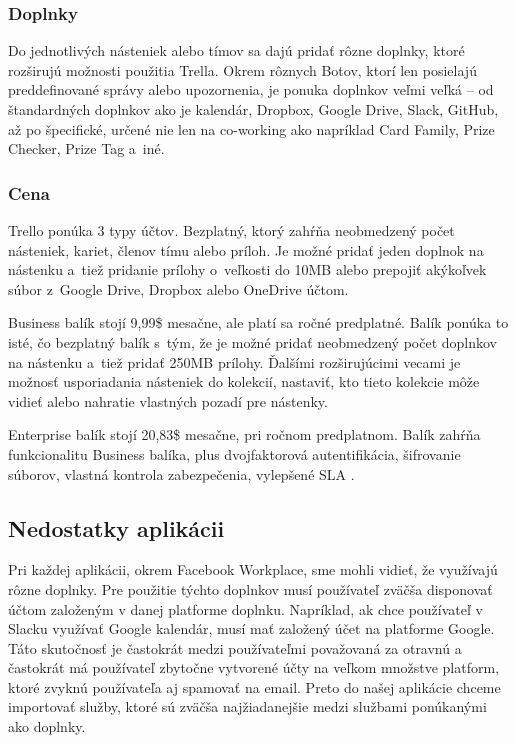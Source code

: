 \subsubsection{Doplnky}
\indent Do jednotlivých násteniek alebo tímov sa dajú pridať rôzne doplnky, ktoré rozširujú možnosti použitia Trella. Okrem rôznych Botov, ktorí len posielajú preddefinované správy alebo upozornenia, je ponuka doplnkov veľmi veľká – od štandardných doplnkov ako je kalendár, Dropbox, Google Drive, Slack, GitHub, až po špecifické, určené nie len na co-working ako napríklad Card Family, Prize Checker, Prize Tag a iné. 
\subsubsection{Cena}
\indent Trello ponúka 3 typy účtov. Bezplatný, ktorý zahŕňa neobmedzený počet násteniek, kariet, členov tímu alebo príloh. Je možné pridať jeden doplnok na nástenku a tiež pridanie prílohy o veľkosti do 10MB alebo prepojiť akýkoľvek súbor z Google Drive, Dropbox alebo OneDrive účtom. 

\indent Business balík stojí 9,99\$ mesačne, ale platí sa ročné predplatné. Balík ponúka to isté, čo bezplatný balík s tým, že je možné pridať neobmedzený počet doplnkov na nástenku a tiež pridať 250MB prílohy. Ďalšími rozširujúcimi vecami je možnosť usporiadania násteniek do kolekcií, nastaviť, kto tieto kolekcie môže vidieť alebo nahratie vlastných pozadí pre nástenky. 

\indent Enterprise balík stojí 20,83\$ mesačne, pri ročnom predplatnom. Balík zahŕňa funkcionalitu Business balíka, plus dvojfaktorová autentifikácia, šifrovanie súborov, vlastná kontrola zabezpečenia, vylepšené SLA \cite{trello}. 

\subsection{Nedostatky aplikácii}
\indent Pri každej aplikácii, okrem Facebook Workplace, sme mohli vidieť, že využívajú rôzne doplnky. Pre použitie týchto doplnkov musí používateľ zväčša disponovať účtom založeným v danej platforme doplnku. Napríklad, ak chce používateľ v Slacku využívať Google kalendár, musí mať založený účet na platforme Google. Táto skutočnosť je častokrát medzi používateľmi považovaná za otravnú a častokrát má používateľ zbytočne vytvorené účty na veľkom množstve platform, ktoré zvyknú používateľa aj spamovať na email. Preto do našej aplikácie chceme importovať služby, ktoré sú zväčša najžiadanejšie medzi službami ponúkanými ako doplnky. 

